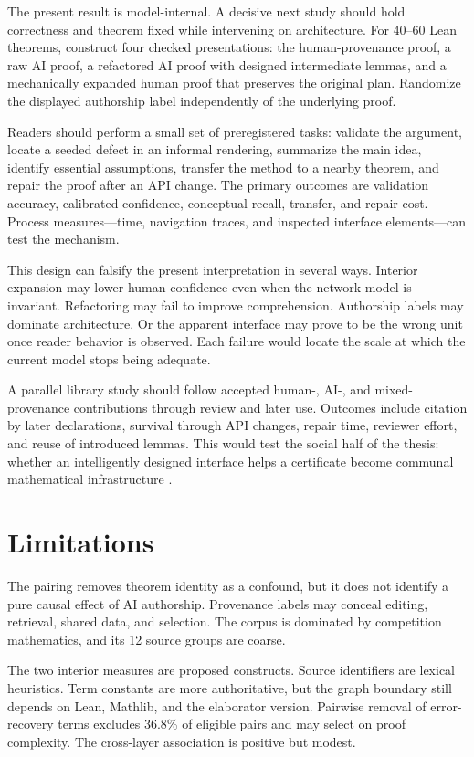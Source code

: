 \documentclass[11pt]{article}
\begin{document}
The present result is model-internal.  A decisive next study should hold correctness and theorem
fixed while intervening on architecture.  For 40--60 Lean theorems, construct four checked
presentations: the human-provenance proof, a raw AI proof, a refactored AI proof with designed
intermediate lemmas, and a mechanically expanded human proof that preserves the original plan.
Randomize the displayed authorship label independently of the underlying proof.

Readers should perform a small set of preregistered tasks: validate the argument, locate a seeded
defect in an informal rendering, summarize the main idea, identify essential assumptions, transfer
the method to a nearby theorem, and repair the proof after an API change.  The primary outcomes are
validation accuracy, calibrated confidence, conceptual recall, transfer, and repair cost.  Process
measures---time, navigation traces, and inspected interface elements---can test the mechanism.

This design can falsify the present interpretation in several ways.  Interior expansion may lower
human confidence even when the network model is invariant.  Refactoring may fail to improve
comprehension.  Authorship labels may dominate architecture.  Or the apparent interface may prove
to be the wrong unit once reader behavior is observed.  Each failure would locate the scale at which
the current model stops being adequate.

A parallel library study should follow accepted human-, AI-, and mixed-provenance contributions
through review and later use.  Outcomes include citation by later declarations, survival through API
changes, repair time, reviewer effort, and reuse of introduced lemmas.  This would test the social
half of the thesis: whether an intelligently designed interface helps a certificate become communal
mathematical infrastructure \citep{pantsar2026}.

\section{Limitations}

The pairing removes theorem identity as a confound, but it does not identify a pure causal effect of
AI authorship.  Provenance labels may conceal editing, retrieval, shared data, and selection.  The
corpus is dominated by competition mathematics, and its 12 source groups are coarse.

The two interior measures are proposed constructs.  Source identifiers are lexical heuristics.
Term constants are more authoritative, but the graph boundary still depends on Lean, Mathlib, and
the elaborator version.  Pairwise removal of error-recovery terms excludes 36.8\% of eligible pairs
and may select on proof complexity.  The cross-layer association is positive but modest.
\end{document}
